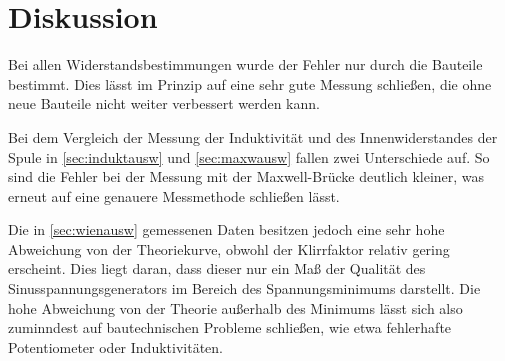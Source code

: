 \section{Diskussion}
\label{sec:Diskussion}

Bei allen Widerstandsbestimmungen wurde der Fehler nur durch die Bauteile
bestimmt. Dies lässt im Prinzip auf eine sehr gute Messung schließen, die ohne
neue Bauteile nicht weiter verbessert werden kann. 

Bei dem Vergleich der Messung der Induktivität und des Innenwiderstandes der Spule
in \autoref{sec:induktausw} und \autoref{sec:maxwausw} fallen zwei Unterschiede auf. 
So sind die Fehler bei der Messung mit der Maxwell-Brücke deutlich kleiner, was erneut auf eine genauere
Messmethode schließen lässt. 

Die in \autoref{sec:wienausw} gemessenen Daten besitzen jedoch eine sehr hohe Abweichung 
von der Theoriekurve, obwohl der Klirrfaktor relativ gering erscheint.
Dies liegt daran, dass dieser nur ein Maß der Qualität des Sinusspannungsgenerators im Bereich des 
Spannungsminimums darstellt. 
Die hohe Abweichung von der Theorie außerhalb des Minimums lässt sich also zuminndest auf 
bautechnischen Probleme schließen, wie etwa fehlerhafte Potentiometer oder Induktivitäten.
